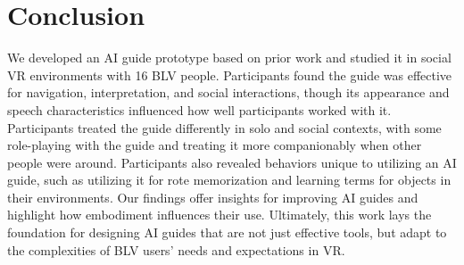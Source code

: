 \section{Conclusion}

We developed an AI guide prototype based on prior work and studied it in social VR environments with 16 BLV people. Participants found the guide was effective for navigation, interpretation, and social interactions, though its appearance and speech characteristics influenced how well participants worked with it. Participants treated the guide differently in solo and social contexts, with some role-playing with the guide and treating it more companionably when other people were around. Participants also revealed behaviors unique to utilizing an AI guide, such as utilizing it for rote memorization and learning terms for objects in their environments. Our findings offer insights for improving AI guides and highlight how embodiment influences their use. Ultimately, this work lays the foundation for designing AI guides that are not just effective tools, but adapt to the complexities of BLV users’ needs and expectations in VR.